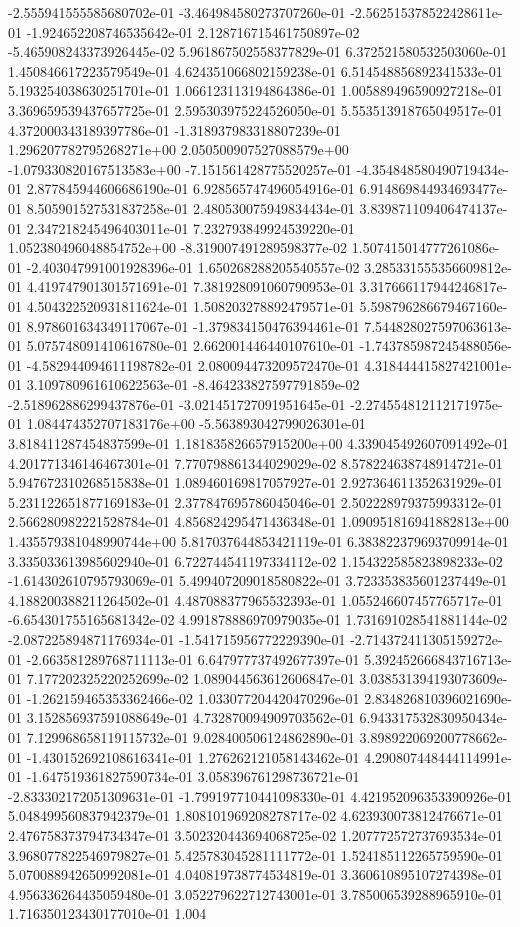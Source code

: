 	-2.555941555585680702e-01	-3.464984580273707260e-01	-2.562515378522428611e-01	-1.924652208746535642e-01	2.128716715461750897e-02	-5.465908243373926445e-02	5.961867502558377829e-01	6.372521580532503060e-01	1.450846617223579549e-01	4.624351066802159238e-01	6.514548856892341533e-01	5.193254038630251701e-01	1.066123113194864386e-01	1.005889496590927218e-01	3.369659539437657725e-01	2.595303975224526050e-01	5.553513918765049517e-01	4.372000343189397786e-01	-1.318937983318807239e-01	1.296207782795268271e+00	2.050500907527088579e+00	-1.079330820167513583e+00	-7.151561428775520257e-01	-4.354848580490719434e-01	2.877845944606686190e-01	6.928565747496054916e-01	6.914869844934693477e-01	8.505901527531837258e-01	2.480530075949834434e-01	3.839871109406474137e-01	2.347218245496403011e-01	7.232793849924539220e-01	1.052380496048854752e+00	-8.319007491289598377e-02	1.507415014777261086e-01	-2.403047991001928396e-01	1.650268288205540557e-02	3.285331555356609812e-01	4.419747901301571691e-01	7.381928091060790953e-01	3.317666117944246817e-01	4.504322520931811624e-01	1.508203278892479571e-01	5.598796286679467160e-01	8.978601634349117067e-01	-1.379834150476394461e-01	7.544828027597063613e-01	5.075748091410616780e-01	2.662001446440107610e-01	-1.743785987245488056e-01	-4.582944094611198782e-01	2.080094473209572470e-01	4.318444415827421001e-01	3.109780961610622563e-01	-8.464233827597791859e-02	-2.518962886299437876e-01	-3.021451727091951645e-01	-2.274554812112171975e-01	1.084474352707183176e+00	-5.563893042799026301e-01	3.818411287454837599e-01	1.181835826657915200e+00	4.339045492607091492e-01	4.201771346146467301e-01	7.770798861344029029e-02	8.578224638748914721e-01	5.947672310268515838e-01	1.089460169817057927e-01	2.927364611352631929e-01	5.231122651877169183e-01	2.377847695786045046e-01	2.502228979375993312e-01	2.566280982221528784e-01	4.856824295471436348e-01	1.090951816941882813e+00	1.435579381048990744e+00	5.817037644853421119e-01	6.383822379693709914e-01	3.335033613985602940e-01	6.722744541197334112e-02	1.154322585823898233e-02	-1.614302610795793069e-01	5.499407209018580822e-01	3.723353835601237449e-01	4.188200388211264502e-01	4.487088377965532393e-01	1.055246607457765717e-01	-6.654301755165681342e-02	4.991878886970979035e-01	1.731691028541881144e-02	-2.087225894871176934e-01	-1.541715956772229390e-01	-2.714372411305159272e-01	-2.663581289768711113e-01	6.647977737492677397e-01	5.392452666843716713e-01	7.177202325220252699e-02	1.089044563612606847e-01	3.038531394193073609e-01	-1.262159465353362466e-02	1.033077204420470296e-01	2.834826810396021690e-01	3.152856937591088649e-01	4.732870094909703562e-01	6.943317532830950434e-01	7.129968658119115732e-01	9.028400506124862890e-01	3.898922069200778662e-01	-1.430152692108616341e-01	1.276262121058143462e-01	4.290807448444114991e-01	-1.647519361827590734e-01	3.058396761298736721e-01	-2.833302172051309631e-01	-1.799197710441098330e-01	4.421952096353390926e-01	5.048499560837942379e-01	1.808101969208278717e-02	4.623930073812476671e-01	2.476758373794734347e-01	3.502320443694068725e-02	1.207772572737693534e-01	3.968077822546979827e-01	5.425783045281111772e-01	1.524185112265759590e-01	5.070088942650992081e-01	4.040819738774534819e-01	3.360610895107274398e-01	4.956336264435059480e-01	3.052279622712743001e-01	3.785006539288965910e-01	1.716350123430177010e-01	1.004